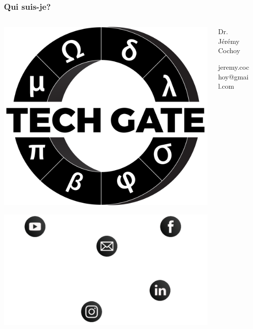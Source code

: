 \documentclass{beamer}
\begin{document}
\begin{frame}
  \frametitle{Qui suis-je?}
  \begin{columns}[T]
    \begin{column}{0.5\textwidth}
      \begin{center}
        \includegraphics[scale=0.06]{techgate}
      \end{center}
      \begin{center}
         \includegraphics[scale=0.25]{social-networks}
      \end{center}
    \end{column}
    \begin{column}{0.5\textwidth}
      \begin{block}{Dr. Jérémy Cochoy}
      \begin{center}
      	 jeremy.cochoy@gmail.com

\end{center}
\end{block}
\end{column}
\end{columns}
\end{frame}
\end{document}
